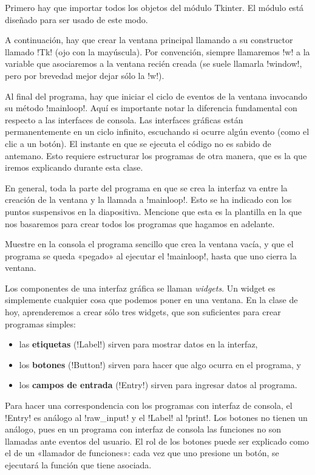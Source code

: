 \documentclass[10pt]{article}
\begin{document}
  Primero hay que importar todos los objetos del módulo Tkinter.
  El módulo está diseñado para ser usado de este modo.

  A continuación,
  hay que crear la ventana principal
  llamando a su constructor llamado \li!Tk! (ojo con la mayúscula).
  Por convención,
  siempre llamaremos \li!w! a la variable
  que asociaremos a la ventana recién creada
  (se suele llamarla \li!window!, pero por brevedad mejor dejar sólo la \li!w!).

  Al final del programa,
  hay que iniciar el ciclo de eventos de la ventana
  invocando su método \li!mainloop!.
  Aquí es importante notar la diferencia fundamental
  con respecto a las interfaces de consola.
  Las interfaces gráficas están permanentemente en un ciclo infinito,
  escuchando si ocurre algún evento (como el clic a un botón).
  El instante en que se ejecuta el código no es sabido de antemano.
  Esto requiere estructurar los programas de otra manera,
  que es la que iremos explicando durante esta clase.

  En general,
  toda la parte del programa en que se crea la interfaz
  va entre la creación de la ventana
  y la llamada a \li!mainloop!.
  Esto se ha indicado  con los puntos suspensivos en la diapositiva.
  Mencione que esta es la plantilla en la que nos basaremos
  para crear todos los programas que hagamos en adelante.

  Muestre en la consola el programa sencillo que crea la ventana vacía,
  y que el programa se queda «pegado» al ejecutar el \li!mainloop!,
  hasta que uno cierra la ventana.


  Los componentes de una interfaz gráfica
  se llaman \emph{widgets}.
  Un widget es simplemente cualquier cosa que podemos poner en una ventana.
  En la clase de hoy,
  aprenderemos a crear sólo tres widgets,
  que son suficientes para crear programas simples:
  \begin{itemize}
    \item las \textbf{etiquetas} (\li!Label!)
      sirven para mostrar datos en la interfaz,
    \item los \textbf{botones} (\li!Button!)
      sirven para hacer que algo ocurra en el programa, y
    \item los \textbf{campos de entrada} (\li!Entry!)
      sirven para ingresar datos al programa.
  \end{itemize}

  Para hacer una correspondencia con los programas con interfaz de consola,
  el \li!Entry! es análogo al \li!raw_input!
  y el \li!Label! al \li!print!.
  Los botones no tienen un análogo,
  pues en un programa con interfaz de consola
  las funciones no son llamadas ante eventos del usuario.
  El rol de los botones puede ser explicado
  como el de un «llamador de funciones»:
  cada vez que uno presione un botón,
  se ejecutará la función que tiene asociada.
\end{document}

